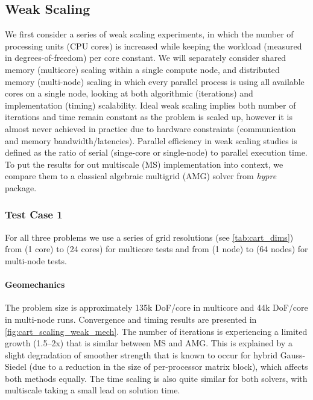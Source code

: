 \subsection{Weak Scaling}
\label{subsec:par_scaling_weak}

We first consider a series of weak scaling experiments, in which the number of processing units (CPU cores) is increased while keeping the workload (measured in degrees-of-freedom) per core constant.   We will separately consider shared memory (multicore) scaling within a single compute node, and distributed memory (multi-node) scaling in which every parallel process is using all available cores on a single node, looking at both algorithmic (iterations) and implementation (timing) scalability.   Ideal weak scaling implies both number of iterations and time remain constant as the problem is scaled up, however it is almost never achieved in practice due to hardware constraints (communication and memory bandwidth/latencies).   Parallel efficiency in weak scaling studies is defined as the ratio of serial (singe-core or single-node) to parallel execution time.   To put the results for out multiscale (MS) implementation into context, we compare them to a classical algebraic multigrid (AMG) solver from \textit{hypre} package. 

\subsubsection{Test Case 1}

For all three problems we use a series of grid resolutions (see \cref{tab:cart_dims}) from  (1 core) to  (24 cores) for multicore tests and from  (1 node) to  (64 nodes) for multi-node tests.   

\paragraph{Geomechanics}
The problem size is approximately 135k DoF/core in multicore and 44k DoF/core in multi-node runs.   Convergence and timing results are presented in \cref{fig:cart_scaling_weak_mech}.   The number of iterations is experiencing a limited growth (1.5--2x) that is similar between MS and AMG.   This is explained by a slight degradation of smoother strength that is known to occur for hybrid Gauss-Siedel (due to a reduction in the size of per-processor matrix block), which affects both methods equally.   The time scaling is also quite similar for both solvers, with multiscale taking a small lead on solution time.

